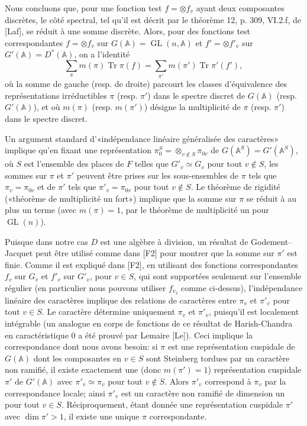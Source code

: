 \documentclass[10pt]{article}
\newcommand{\Adele}{\mathbb A}
\newcommand{\GL}{\operatorname{GL}}
\newcommand{\Tr}{\operatorname{Tr}}
\theoremstyle{deligne}
\begin{document}
Nous concluons que, pour une fonction test $f=\otimes f_v$ ayant deux composantes discrètes, le côté spectral, tel qu'il est décrit par le théorème 12, p. 309, VI.2.f, de [Laf], se réduit à une somme discrète. Alors, pour des fonctions test correspondantes $f=\otimes f_v$ sur $G(\Adele)=\GL(n,\Adele)$ et $f'=\otimes f'_v$ sur $G'(\Adele)=D^*(\Adele)$, on a l'identité
\[
\sum_\pi m(\pi)\Tr\pi(f)=\sum_{\pi'}m(\pi')\Tr\pi'(f'),
\]
où la somme de gauche (resp. de droite) parcourt les classes d'équivalence des représentations irréductibles $\pi$ (resp. $\pi'$) dans le spectre discret de $G(\Adele)$ (resp. $G'(\Adele)$), et où $m(\pi)$ (resp. $m(\pi')$) désigne la multiplicité de $\pi$ (resp. $\pi'$) dans le spectre discret.

Un argument standard d'«indépendance linéaire généralisée des caractères» implique qu'en fixant une représentation $\pi_0^S=\otimes_{v\notin S}\pi_{0v}$ de $G(\Adele^S)=G'(\Adele^S)$, où $S$ est l'ensemble des places de $F$ telles que $G'_v\simeq G_v$ pour tout $v\notin S$, les sommes sur $\pi$ et $\pi'$ peuvent être prises sur les sous-ensembles de $\pi$ tels que $\pi_v=\pi_{0v}$ et de $\pi'$ tels que $\pi'_v=\pi_{0v}$ pour tout $v\notin S$. Le théorème de rigidité («théorème de multiplicité un fort») implique que la somme sur $\pi$ se réduit à au plus un terme (avec $m(\pi)=1$, par le théorème de multiplicité un pour $\GL(n)$).

Puisque dans notre cas $D$ est une algèbre à division, un résultat de Godement--Jacquet peut être utilisé comme dans [F2] pour montrer que la somme sur $\pi'$ est finie. Comme il est expliqué dans [F2], en utilisant des fonctions correspondantes $f_v$ sur $G_v$ et $f'_v$ sur $G'_v$, pour $v\in S$, qui sont supportées seulement sur l'ensemble régulier (en particulier nous pouvons utiliser $f_{v_3}$ comme ci-dessus), l'indépendance linéaire des caractères implique des relations de caractères entre $\pi_v$ et $\pi'_v$ pour tout $v\in S$. Le caractère détermine uniquement $\pi_v$ et $\pi'_v$, puisqu'il est localement intégrable (un analogue en corps de fonctions de ce résultat de Harish-Chandra en caractéristique $0$ a été prouvé par Lemaire [Le]). Ceci implique la correspondance dont nous avons besoin: si $\pi$ est une représentation cuspidale de $G(\Adele)$ dont les composantes en $v\in S$ sont Steinberg tordues par un caractère non ramifié, il existe exactement une (donc $m(\pi')=1$) représentation cuspidale $\pi'$ de $G'(\Adele)$ avec $\pi'_v\simeq\pi_v$ pour tout $v\notin S$. Alors $\pi'_v$ correspond à $\pi_v$ par la correspondance locale; ainsi $\pi'_v$ est un caractère non ramifié de dimension un pour tout $v\in S$. Réciproquement, étant donnée une représentation cuspidale $\pi'$ avec $\dim\pi'>1$, il existe une unique $\pi$ correspondante.
\end{document}
